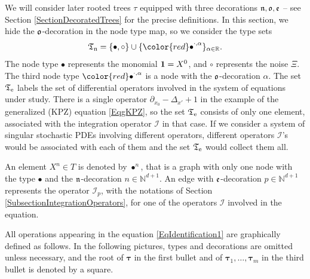 \documentclass[10pt, reqno]{amsart}
\numberwithin{subsection}{section}
\numberwithin{subsubsection}{subsection}
\numberwithin{equation}{section} %
\theoremstyle{mystyle}
\theoremstyle{mystyle2}
\theoremstyle{mystyle3}
\newcommand{\bstau}{\boldsymbol{\tau}}
\newcommand\bbN{\mathbb{N}}
\newcommand\bbR{\mathbb{R}}
\newcommand{\mcI}{\mathcal{I}}
\begin{document}
\medskip

We will consider later rooted trees $\tau$ equipped with three decorations $\frak{n},\frak{o},\frak{e}$ -- see Section \ref{SectionDecoratedTrees} 
for the precise definitions. In this section, we hide the $\frak{o}$-decoration in the node type map, so we consider the type sets
$$
\frak{T}_{\rm n}=\{\bullet,\circ\}\cup\{{\color{red}\bullet}^{\cdot,\alpha}\}_{\alpha\in\bbR}.
$$
The node type $\bullet$ represents the monomial ${\bf1}=X^0$, and $\circ$ represents the noise $\Xi$. The third node type ${\color{red}\bullet}^{\cdot,\alpha}$ is a node with the $\frak{o}$-decoration $\alpha$. The set $\frak{T}_{\rm e}$ labels the set of differential operators involved in 
the system of equations under study. There is a single operator $\partial_{x_0}-\Delta_{x'}+1$ in the example of the generalized (KPZ) equation \eqref{EqgKPZ}, so the set $\frak{T}_{\rm e}$ consists of only one element, associated with the integration operator $\mcI$ in that case. If we consider a system of singular stochastic PDEs involving different operators, different operators $\mcI$'s would be associated with each of them and the set $\frak{T}_{\rm e}$ would collect them all. 

An element $X^n\in T$ is denoted by $\bullet^n$, that is a graph with only one node with the type $\bullet$ and the $\frak{n}$-decoration $n\in\bbN^{d+1}$. An edge with $\frak{e}$-decoration $p\in\bbN^{d+1}$ represents the operator $\mcI_p$, with the notations of Section \ref{SubsectionIntegrationOperators}, for one of the operators $\mcI$ involved in the equation.

All operations appearing in the equation \eqref{EqIdentification1} are graphically defined as follows. In the following pictures, types and decorations are omitted unless necessary, and the root of $\bstau$ in the first bullet and of $\bstau_1,\dots,\bstau_m$ in the third bullet is denoted by a square.
\end{document}
